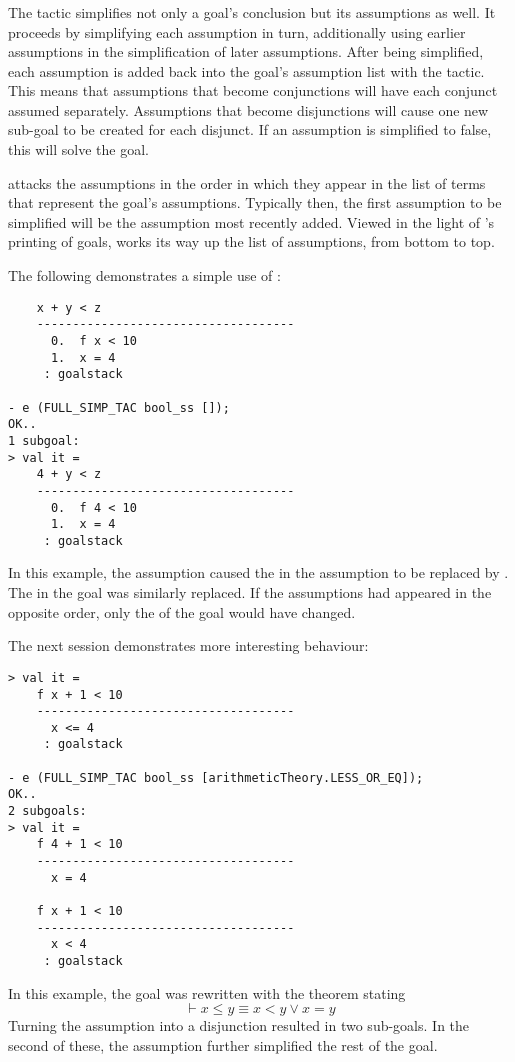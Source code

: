 \subsubsection{}

\noindent
The tactic  simplifies not only a goal's
conclusion but its assumptions as well.  It proceeds by simplifying
each assumption in turn, additionally using earlier assumptions in the
simplification of later assumptions.  After being simplified, each
assumption is added back into the goal's assumption list with the
 tactic.  This means that assumptions that
become conjunctions will have each conjunct assumed separately.
Assumptions that become disjunctions will cause one new sub-goal to be
created for each disjunct.  If an assumption is simplified to false,
this will solve the goal.

 attacks the assumptions in the order in which
they appear in the list of terms that represent the goal's
assumptions.  Typically then, the first assumption to be simplified
will be the assumption most recently added.  Viewed in the light of
's printing of goals,  works its
way up the list of assumptions, from bottom to top.

The following demonstrates a simple use of :
\begin{session}
\begin{verbatim}
    x + y < z
    ------------------------------------
      0.  f x < 10
      1.  x = 4
     : goalstack

- e (FULL_SIMP_TAC bool_ss []);
OK..
1 subgoal:
> val it =
    4 + y < z
    ------------------------------------
      0.  f 4 < 10
      1.  x = 4
     : goalstack
\end{verbatim}
\end{session}
In this example, the assumption  caused the 
in the assumption  to be replaced by .  The
 in the goal was similarly replaced.  If the assumptions had
appeared in the opposite order, only the  of the goal would
have changed.

The next session demonstrates more interesting behaviour:
\begin{session}
\begin{verbatim}
> val it =
    f x + 1 < 10
    ------------------------------------
      x <= 4
     : goalstack

- e (FULL_SIMP_TAC bool_ss [arithmeticTheory.LESS_OR_EQ]);
OK..
2 subgoals:
> val it =
    f 4 + 1 < 10
    ------------------------------------
      x = 4

    f x + 1 < 10
    ------------------------------------
      x < 4
     : goalstack
\end{verbatim}
\end{session}
In this example, the goal was rewritten with the theorem stating
\[
\vdash x \leq y \equiv x < y \lor x = y
\]
Turning the assumption into a disjunction resulted in two sub-goals.
In the second of these, the assumption  further
simplified the rest of the goal.

